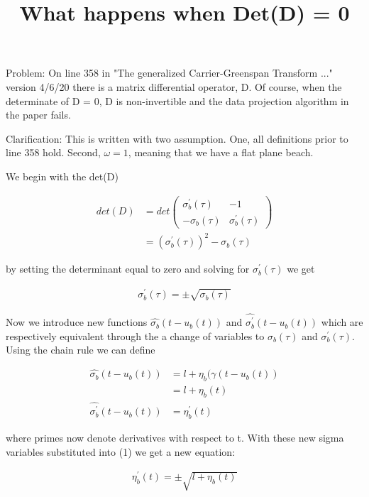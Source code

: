 \documentclass{article}
\title{ What happens when Det(D) = 0 }
\begin{document}
\maketitle

Problem: On line 358 in "The generalized Carrier-Greenspan Transform ..." version 4/6/20 there is a matrix differential operator, D. Of course, when the determinate of D = 0, D is non-invertible and the data projection algorithm in the paper fails.

Clarification: This is written with two assumption. One, all definitions prior to line 358 hold. Second, $\omega = 1$, meaning that we have a flat plane beach.

We begin with the det(D)

\[
\begin{aligned}
det(D) &= det\begin{pmatrix} \sigma_b^\prime(\tau) & -1 \\ -\sigma_b(\tau) & \sigma_b^\prime(\tau) \end{pmatrix} 
 \\ &= (\sigma_b^\prime(\tau))^2 - \sigma_b(\tau)
\end{aligned}
\]

by setting the determinant equal to zero and solving for $\sigma_b^\prime(\tau)$ we get

\begin{align}
\sigma_b^\prime(\tau) = \pm\sqrt{\sigma_b(\tau)}
\end{align}


Now we introduce new functions $\hat{\sigma_b}(t - u_b(t))$ and $\hat{\sigma_b^\prime}(t - u_b(t))$ which are respectively equivalent through the a change of variables to $\sigma_b(\tau)$ and $\sigma_b^\prime(\tau)$. Using the chain rule we can define 

\[
\begin{aligned}
\hat{\sigma_b}(t - u_b(t)) & = l +\eta_b(\gamma(t-u_b(t)) \\ &= l + \eta_b(t) \\
\hat{\sigma_b^\prime}(t - u_b(t)) &= \eta_b^\prime(t)
\end{aligned}
\]


where primes now denote derivatives with respect to t. With these new sigma variables substituted into (1) we get a new equation:

\begin{align}
\eta_b^\prime(t) = \pm \sqrt{l + \eta_b(t)}
\end{align}
\end{document}
